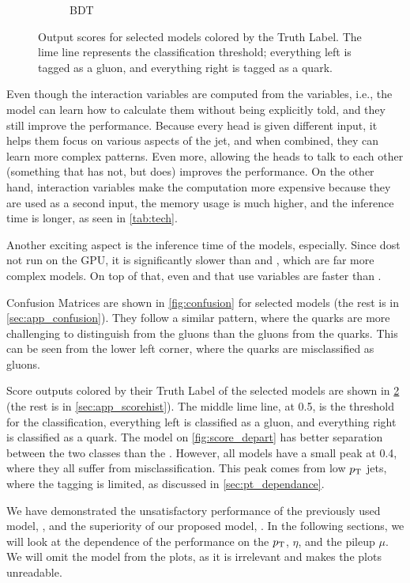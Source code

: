 \begin{figure}[ht]
\begin{subfigure}[b]{0.49\textwidth}
        \caption{BDT}
        \label{fig:score_bdt}
    \end{subfigure}
    \caption{Output scores for selected models colored by the Truth Label. The lime line represents the classification threshold; everything left is tagged as a gluon, and everything right is tagged as a quark.}
    \label{fig:score}
\end{figure}

Even though the interaction variables are computed from the \PFO variables, i.e., the model can learn how to calculate them without being explicitly told, and they still improve the performance.
Because every head is given different input, it helps them focus on various aspects of the jet, and when combined, they can learn more complex patterns.
Even more, allowing the heads to talk to each other (something that \ParT has not, but \depart does) improves the performance.
On the other hand, interaction variables make the computation more expensive because they are used as a second input, the memory usage is much higher, and the inference time is longer, as seen in \cref{tab:tech}.


Another exciting aspect is the inference time of the models, \bdt especially. 
Since \bdt dost not run on the GPU, it is significantly slower than \highway and \fc, which are far more complex models.
On top of that, even \EFN and \PFN that use \PFO variables are faster than \bdt.

Confusion Matrices are shown in \cref{fig:confusion} for selected models (the rest is in \cref{sec:app_confusion}).
They follow a similar pattern, where the quarks are more challenging to distinguish from the gluons than the gluons from the quarks.
This can be seen from the lower left corner, where the quarks are misclassified as gluons.

Score outputs colored by their Truth Label of the selected models are shown in \cref{fig:score} (the rest is in \cref{sec:app_scorehist}).
The middle lime line, at 0.5, is the threshold for the classification, everything left is classified as a gluon, and everything right is classified as a quark.
The \depart model on \cref{fig:score_depart} has better separation between the two classes than the \bdt.
However, all models have a small peak at 0.4, where they all suffer from misclassification.
This peak comes from low $p_\text{T}$ jets, where the tagging is limited, as discussed in \cref{sec:pt_dependance}.

We have demonstrated the unsatisfactory performance of the previously used model, \bdt, and the superiority of our proposed model, \depart.
In the following sections, we will look at the dependence of the performance on the $p_\text{T}$, $\eta$, and the pileup $\mu$.
We will omit the \bdt model from the plots, as it is irrelevant and makes the plots unreadable.

